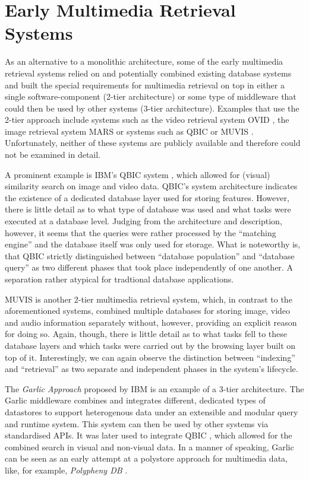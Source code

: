 \section{Early Multimedia Retrieval Systems}

As an alternative to a monolithic architecture, some of the early multimedia retrieval systems relied on and potentially combined existing database systems and built the special requirements for multimedia retrieval on top in either a single software-component (2-tier architecture) or some type of middleware that could then be used by other systems (3-tier architecture). Examples that use the 2-tier approach include systems such as the video retrieval system OVID \cite{Oomoto:1993OVID}, the image retrieval system MARS \cite{Rui:1997Content} or systems such as QBIC \cite{Flickner:1995Query} or MUVIS \cite{Kiranyaz:2003Muvis}. Unfortunately, neither of these systems are publicly available and therefore could not be examined in detail.

A prominent example is IBM's QBIC system \cite{Flickner:1995Query}, which allowed for (visual) similarity search on image and video data. QBIC's system architecture indicates the existence of a dedicated database layer used for storing features. However, there is little detail as to what type of database was used and what tasks were executed at a database level. Judging from the architecture and description, however, it seems that the queries were rather processed by the ``matching engine'' and the database itself was only used for storage. What is noteworthy is, that QBIC strictly distinguished between ``database population'' and ``database query'' as two different phases that took place independently of one another. A separation rather atypical for tradtional database applications.

MUVIS \cite{Kiranyaz:2003Muvis} is another 2-tier multimedia retrieval system, which, in contrast to the aforementioned systems, combined multiple databases for storing image, video and audio information separately without, however, providing an explicit reason for doing so. Again, though, there is little detail as to what tasks fell to these database layers and which tasks were carried out by the browsing layer built on top of it. Interestingly, we can again observe the distinction between ``indexing'' and ``retrieval'' as two separate and independent phases in the system's lifecycle.

The \emph{Garlic Approach} \cite{Carey:1995Towards} proposed by IBM is an example of a 3-tier architecture. The Garlic middleware combines and integrates different, dedicated types of datastores to support heterogenous data under an extensible and modular query and runtime system. This system can then be used by other systems via standardised APIs. It was later used to integrate QBIC \cite{Cody:1995Querying}, which allowed for the combined search in visual and non-visual data. In a manner of speaking, Garlic can be seen as an early attempt at a polystore approach for multimedia data, like, for example, \emph{Polypheny DB} \cite{Vogt:2018Polypheny}. 


